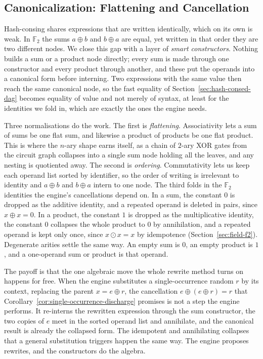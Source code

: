   \subsection{Canonicalization: Flattening and Cancellation}
  \label{sec:canonicalization}

  Hash-consing shares expressions that are written identically, which on its own
  is weak. In $\mathbb{F}_2$ the sums $a \oplus b$ and $b \oplus a$ are equal,
  yet written in that order they are two different nodes. We close this gap with a
  layer of \emph{smart constructors}. Nothing builds a sum or a product node
  directly; every sum is made through one constructor and every product through
  another, and these put the operands into a canonical form before interning.
  Two expressions with the same value then reach the same canonical node, so the
  fast equality of Section~\ref{sec:hash-consed-dag} becomes equality of value
  and not merely of syntax, at least for the identities we fold in, which are
  exactly the ones the engine needs.

  Three normalisations do the work. The first is \emph{flattening}.
  Associativity lets a sum of sums be one flat sum, and likewise a product of
  products be one flat product. This is where the $n$-ary shape earns itself, as
  a chain of $2$-ary XOR gates from the circuit graph collapses into a single sum node
  holding all the leaves, and any nesting is quotiented away. The second is
  \emph{ordering}. Commutativity lets us keep each operand list sorted by
  identifier, so the order of writing is irrelevant to identity and $a \oplus b$
  and $b \oplus a$ intern to one node. The third folds in the $\mathbb{F}_2$
  identities the engine's cancellations depend on. In a sum, the constant $0$ is
  dropped as the additive identity, and a repeated operand is deleted in pairs,
  since $x \oplus x = 0$.
  In a product, the constant $1$ is dropped as the multiplicative identity, the
  constant $0$ collapses the whole product to $0$ by annihilation, and a repeated
  operand is kept only once, since $x \odot x = x$ by idempotence
  (Section~\ref{sec:field-f2}). Degenerate arities settle the same way. An empty
  sum is $0$, an empty product is $1$, and a one-operand sum or product is that
  operand.

  The payoff is that the one algebraic move the whole rewrite method turns on
  happens for free. When the engine substitutes a single-occurrence random $r$ by
  its context, replacing the parent $x = e \oplus r$, the cancellation
  $e \oplus (e \oplus r) = r$ that Corollary~\ref{cor:single-occurrence-discharge}
  promises is not a step the engine performs. It re-interns the rewritten
  expression through the sum constructor, the two copies of $e$ meet in the sorted
  operand list and annihilate, and the canonical result is already the collapsed
  form. The idempotent and annihilating collapses that a general substitution
  triggers happen the same way. The engine proposes rewrites, and the
  constructors do the algebra.

